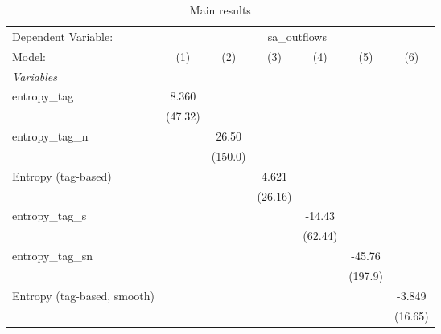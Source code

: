 
\begin{table}[htbp]
   \centering
   \caption{\label{tab:reg_sa_outflows_tag.tex} Main results}
   \begin{footnotesize}
      \begin{tabular}{lcccccc}
         \tabularnewline\midrule\midrule
         Dependent Variable: & \multicolumn{6}{c}{sa\_outflows}\\
         Model:                      & (1)           & (2)           & (3)           & (4)           & (5)           & (6)\\
         \midrule \emph{Variables} &   &   &   &   &   &  \\
         entropy\_tag               & 8.360         &               &               &               &               &   \\
                                     & (47.32)       &               &               &               &               &   \\
         entropy\_tag\_n           &               & 26.50         &               &               &               &   \\
                                     &               & (150.0)       &               &               &               &   \\
         Entropy (tag-based)         &               &               & 4.621         &               &               &   \\
                                     &               &               & (26.16)       &               &               &   \\
         entropy\_tag\_s           &               &               &               & -14.43        &               &   \\
                                     &               &               &               & (62.44)       &               &   \\
         entropy\_tag\_sn          &               &               &               &               & -45.76        &   \\
                                     &               &               &               &               & (197.9)       &   \\
         Entropy (tag-based, smooth) &               &               &               &               &               & -3.849\\
                                     &               &               &               &               &               & (16.65)\\

\end{tabular}
\end{footnotesize}
\end{table}
